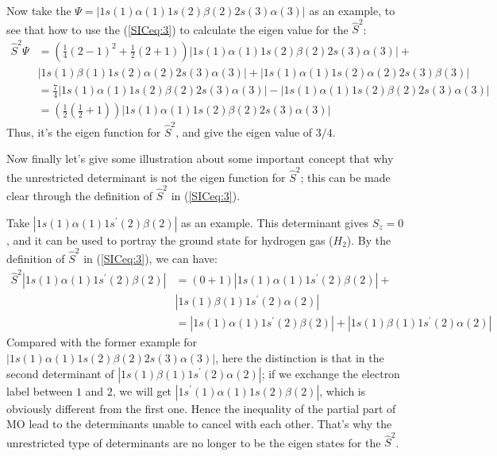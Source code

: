 Now take the $\Psi = |1s(1)\alpha(1)1s(2)\beta(2)2s(3)\alpha(3)|$ as
an example, to see that how to use the (\ref{SICeq:3}) to calculate
the eigen value for the $\hat{S}^{2}$:
\begin{equation}\label{}
\begin{split}
\hat{S}^{2}\Psi &= \left(\frac{1}{4}(2 - 1)^{2} + \frac{1}{2}(2 +
1)\right)|1s(1)\alpha(1)1s(2)\beta(2)2s(3)\alpha(3)| + \\
&|1s(1)\beta(1)1s(2)\alpha(2)2s(3)\alpha(3)| +
|1s(1)\alpha(1)1s(2)\alpha(2)2s(3)\beta(3)| \\
&=\frac{7}{4}|1s(1)\alpha(1)1s(2)\beta(2)2s(3)\alpha(3)| -
|1s(1)\alpha(1)1s(2)\beta(2)2s(3)\alpha(3)| \\
&=\left(\frac{1}{2}(\frac{1}{2} +
1)\right)|1s(1)\alpha(1)1s(2)\beta(2)2s(3)\alpha(3)|
\end{split}
\end{equation}
Thus, it's the eigen function for $\hat{S}^{2}$, and give the eigen
value of $3/4$.

Now finally let's give some illustration about some important concept
that why the unrestricted determinant is not the eigen function for
$\hat{S}^{2}$; this can be made clear through the definition of
$\hat{S}^{2}$ in (\ref{SICeq:3}). 

Take $|1s(1)\alpha(1)1s^{'}(2)\beta(2)|$ as an example. This
determinant gives $S_{z} = 0$, and it can be used to portray the
ground state for hydrogen gas ($H_{2}$). By the definition of
$\hat{S}^{2}$ in (\ref{SICeq:3}), we can have:
\begin{equation}
  \begin{split}
    \hat{S}^{2} |1s(1)\alpha(1)1s^{'}(2)\beta(2)| &= \left( 0 +
      1\right)|1s(1)\alpha(1)1s^{'}(2)\beta(2)| + \\
    & |1s(1)\beta(1)1s^{'}(2)\alpha(2)| \\
&=  |1s(1)\alpha(1)1s^{'}(2)\beta(2)| +
    |1s(1)\beta(1)1s^{'}(2)\alpha(2)|
  \end{split}
\end{equation}
Compared with the former example for
$|1s(1)\alpha(1)1s(2)\beta(2)2s(3)\alpha(3)|$, here the
distinction is that in the second determinant of
$|1s(1)\beta(1)1s^{'}(2)\alpha(2)|$; if we exchange the electron label
between $1$ and $2$, we will get $|1s^{'}(1)\alpha(1)1s(2)\beta(2)|$,
which is obviously different from the first one. Hence the inequality
of the partial part of MO lead to the determinants unable to cancel
with each other. That's why the unrestricted type of determinants are
no longer to be the eigen states for the $\hat{S}^{2}$. 



